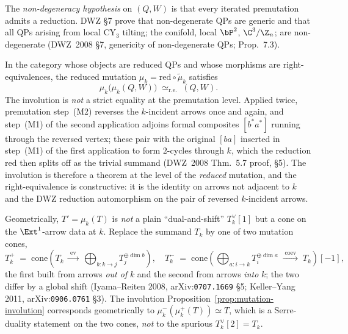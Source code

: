 The \emph{non-degeneracy hypothesis} on $(Q, W)$ is that every iterated
premutation admits a reduction. DWZ \S7 prove that non-degenerate QPs are
generic and that all QPs arising from local CY$_3$ tilting; the conifold,
local $\bP^2$, $\C^3/\Z_n$; are non-degenerate (DWZ~2008 \S7, genericity
of non-degenerate QPs; Prop.~7.3).

\begin{proposition}
\label{prop:mutation-involution}
In the category whose objects are reduced QPs and
whose morphisms are right-equivalences, the reduced mutation
$\mu_k = \mathrm{red} \circ \tilde\mu_k$ satisfies
\[
 \mu_k\bigl(\mu_k(Q, W)\bigr) \;\simeq_{\mathrm{r.e.}}\; (Q, W).
\]
The involution is \emph{not} a strict equality at the premutation level.
Applied twice, premutation step~(M2) reverses the $k$-incident arrows once
and again, and step~(M1) of the second application adjoins formal composites
$[b^{*} a^{*}]$ running through the reversed vertex; these pair with the
original $[ba]$ inserted in step~(M1) of the first application to form
$2$-cycles through $k$, which the reduction $\mathrm{red}$ then splits off
as the trivial summand (DWZ~2008 Thm.~5.7 proof, \S5). The involution is
therefore a theorem at the level of the \emph{reduced} mutation, and the
right-equivalence is constructive: it is the identity on arrows not adjacent
to $k$ and the DWZ reduction automorphism on the pair of reversed $k$-incident
arrows.
\end{proposition}

Geometrically, $T' = \mu_k(T)$ is \emph{not} a plain ``dual-and-shift''
$T_k^{\vee}[1]$ but a cone on the $\Ext^1$-arrow data at $k$. Replace the
summand $T_k$ by one of two mutation cones,
\[
 T_k^{+} \;=\; \mathrm{cone}\!\left(T_k \;\xrightarrow{\;\mathrm{ev}\;}\;
 \bigoplus_{b \colon k \to j} T_j^{\oplus \dim b}\right),
 \quad
 T_k^{-} \;=\; \mathrm{cone}\!\left(\bigoplus_{a \colon i \to k}
 T_i^{\oplus \dim a} \;\xrightarrow{\;\mathrm{coev}\;}\; T_k\right)[-1],
\]
the first built from arrows \emph{out of} $k$ and the second from arrows
\emph{into} $k$; the two differ by a global shift (Iyama--Reiten 2008,
arXiv:\texttt{0707.1669} \S5; Keller--Yang 2011, arXiv:\texttt{0906.0761}
\S3). The involution Proposition~\ref{prop:mutation-involution} corresponds
geometrically to $\mu_k^{-}(\mu_k^{+}(T)) \simeq T$, which is a
Serre-duality statement on the two cones, \emph{not} to the spurious
$T_k^{\vee}[2] = T_k$.

